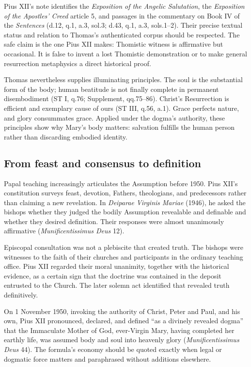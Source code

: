 Pius XII's note identifies the \emph{Exposition of the Angelic Salutation}, the \emph{Exposition of the Apostles' Creed} article 5, and passages in the commentary on Book IV of the \emph{Sentences} (d.12, q.1, a.3, sol.3; d.43, q.1, a.3, sols.1--2). Their precise textual status and relation to Thomas's authenticated corpus should be respected. The safe claim is the one Pius XII makes: Thomistic witness is affirmative but occasional. It is false to invent a lost Thomistic demonstration or to make general resurrection metaphysics a direct historical proof.

Thomas nevertheless supplies illuminating principles. The soul is the substantial form of the body; human beatitude is not finally complete in permanent disembodiment (ST I, q.76; Supplement, qq.75--86). Christ's Resurrection is efficient and exemplary cause of ours (ST III, q.56, a.1). Grace perfects nature, and glory consummates grace. Applied under the dogma's authority, these principles show why Mary's body matters: salvation fulfills the human person rather than discarding embodied identity.

\subsection{From feast and consensus to definition}

Papal teaching increasingly articulates the Assumption before 1950. Pius XII's constitution surveys feast, devotion, Fathers, theologians, and predecessors rather than claiming a new revelation. In \emph{Deiparae Virginis Mariae} (1946), he asked the bishops whether they judged the bodily Assumption revealable and definable and whether they desired definition. Their responses were almost unanimously affirmative (\emph{Munificentissimus Deus} 12).

Episcopal consultation was not a plebiscite that created truth. The bishops were witnesses to the faith of their churches and participants in the ordinary teaching office. Pius XII regarded their moral unanimity, together with the historical evidence, as a certain sign that the doctrine was contained in the deposit entrusted to the Church. The later solemn act identified that revealed truth definitively.

On 1 November 1950, invoking the authority of Christ, Peter and Paul, and his own, Pius XII pronounced, declared, and defined ``as a divinely revealed dogma'' that the Immaculate Mother of God, ever-Virgin Mary, having completed her earthly life, was assumed body and soul into heavenly glory (\emph{Munificentissimus Deus} 44). The formula's economy should be quoted exactly when legal or dogmatic force matters and paraphrased without additions elsewhere.

